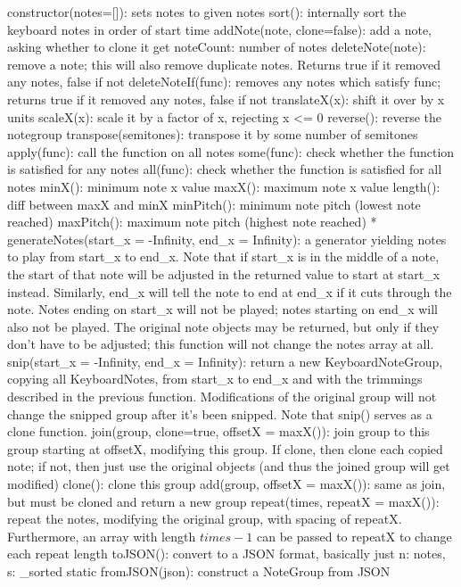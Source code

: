 \documentclass{article}
\begin{document}
constructor(notes=[]): sets notes to given notes
sort(): internally sort the keyboard notes in order of start time
addNote(note, clone=false): add a note, asking whether to clone it
get noteCount: number of notes
deleteNote(note): remove a note; this will also remove duplicate notes. Returns true if it removed any notes, false if not
deleteNoteIf(func): removes any notes which satisfy func; returns true if it removed any notes, false if not
translateX(x): shift it over by x units
scaleX(x): scale it by a factor of x, rejecting x <= 0
reverse(): reverse the notegroup
transpose(semitones): transpose it by some number of semitones
apply(func): call the function on all notes
some(func): check whether the function is satisfied for any notes
all(func): check whether the function is satisfied for all notes
minX(): minimum note x value
maxX(): maximum note x value
length(): diff between maxX and minX
minPitch(): minimum note pitch (lowest note reached)
maxPitch(): maximum note pitch (highest note reached)
* generateNotes(start_x = -Infinity, end_x = Infinity): a generator yielding notes to play from start_x to end_x. Note that if start_x is in the middle of a note, the start of that note will be adjusted in the returned value to start at start_x instead. Similarly, end_x will tell the note to end at end_x if it cuts through the note. Notes ending on start_x will not be played; notes starting on end_x will also not be played. The original note objects may be returned, but only if they don't have to be adjusted; this function will not change the notes array at all.
snip(start_x = -Infinity, end_x = Infinity): return a new KeyboardNoteGroup, copying all KeyboardNotes, from start_x to end_x and with the trimmings described in the previous function. Modifications of the original group will not change the snipped group after it's been snipped. Note that snip() serves as a clone function.
join(group, clone=true, offsetX = maxX()): join group to this group starting at offsetX, modifying this group. If clone, then clone each copied note; if not, then just use the original objects (and thus the joined group will get modified)
clone(): clone this group
add(group, offsetX = maxX()): same as join, but must be cloned and return a new group
repeat(times, repeatX = maxX()): repeat the notes, modifying the original group, with spacing of repeatX. Furthermore, an array with length $times-1$ can be passed to repeatX to change each repeat length
toJSON(): convert to a JSON format, basically just {n: notes, s: _sorted}
static fromJSON(json): construct a NoteGroup from JSON
\end{document}
